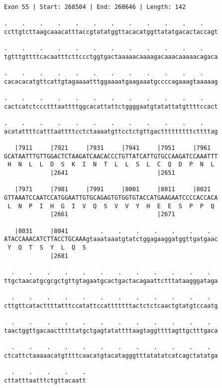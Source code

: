 \documentclass{article}
\begin{document}
\begin{Verbatim}
Exon 55 | Start: 268504 | End: 268646 | Length: 142
 
.    .    .    .    .    .    .    .    .    .    .    .    
ccttgtcttaagcaaacatttaccgtatatggttacacatggttatatgacactaccagt
  
.    .    .    .    .    .    .    .    .    .    .    .    
tgtttgttttcacaatttcttccctggtgactaaaaacaaaagacaaacaaaaacagaca
  
.    .    .    .    .    .    .    .    .    .    .    .    
cacacacatgttcattgtagaaaatttggaaaatgaagaaatgccccagaaagtaaaaag
  
.    .    .    .    .    .    .    .    .    .    .    .    
cactcatctccctttaattttggcacattattctggggaatgtatattatgttttccact
  
.    .    .    .    .    .    .    .    .    .    .    .    
acatattttcatttaattttcctctaaaatgttcctctgttgactttttttttcttttag
  
   |7911     |7921     |7931     |7941     |7951     |7961  
GCATAATTTGTTGGACTCTAAGATCAACACCCTGTTATCATTGTGCCAAGATCCAAATTT
 H  N  L  L  D  S  K  I  N  T  L  L  S  L  C  Q  D  P  N  L 
             |2641                         |2651            
  
   |7971     |7981     |7991     |8001     |8011     |8021  
GTTAAATCCAATCCATGGAATTGTGCAGAGTGTGGTGTACCATGAAGAATCCCCACCACA
 L  N  P  I  H  G  I  V  Q  S  V  V  Y  H  E  E  S  P  P  Q 
             |2661                         |2671            
  
   |8031     |8041         .    .    .    .    .    .    .  
ATACCAAACATCTTACCTGCAAAgtaaataaatgtatctggagaaggatggttgatgaac
 Y  Q  T  S  Y  L  Q  S                                     
             |2681                                          
  
  .    .    .    .    .    .    .    .    .    .    .    .  
ttgctaacatgcgcgctgttgtagaatgcactgactacagaattctttataagggataga
  
  .    .    .    .    .    .    .    .    .    .    .    .  
cttgttcatacttttatttccatattccatttttttactctctcaactgtatgtccaatg
  
  .    .    .    .    .    .    .    .    .    .    .    .  
taactggttgacaactttttatgctgagtatattttaagtaggttttagttgctttgaca
  
  .    .    .    .    .    .    .    .    .    .    .    .  
ctcattctaaaaacatgttttcaacatgtacatagggtttatatatcatcagctatatga
  
  .    .    .    .    .
cttatttaatttctgttacaatt
\end{Verbatim}
\end{document}
